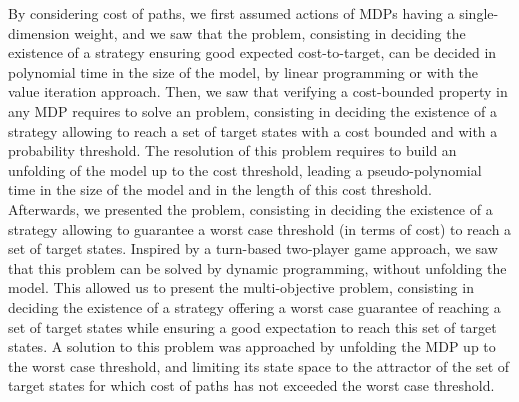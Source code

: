 By considering cost of paths, we first assumed actions of MDPs having a single-dimension weight, and we saw that the \SSPE{} problem, consisting in deciding the existence of a strategy ensuring good expected cost-to-target, can be decided in polynomial time in the size of the model, by linear programming or with the value iteration approach.
Then, we saw that verifying a cost-bounded property in any MDP
requires to solve an \SSPP{} problem, consisting in deciding the existence of a strategy allowing to reach a set of target states with a cost bounded and with a probability threshold.
The resolution of this problem requires to build an unfolding of the model up to the cost threshold, leading a pseudo-polynomial time in the size of the model and in the length of this cost threshold.\\

Afterwards, we presented the \SPG{} problem, consisting in deciding the existence of a strategy allowing to guarantee a worst case threshold (in terms of cost) to reach a set of target states.
Inspired by a turn-based two-player game approach, we saw that this problem
can be solved by dynamic programming, without unfolding the model.
This allowed us to present the multi-objective \SSPWE{} problem, consisting in deciding the existence of a strategy offering a worst case guarantee of reaching a set of target states while ensuring a good expectation to reach this set of target states.
A solution to this problem was approached by unfolding the MDP up to the worst case threshold, and limiting its state space to the attractor of the set of target states for which cost of paths has not exceeded the worst case threshold.\\

